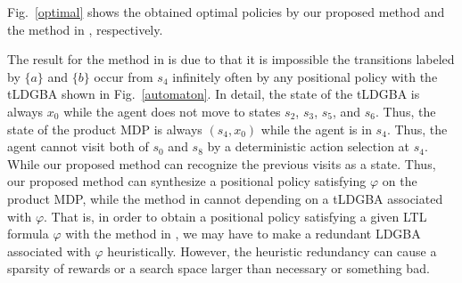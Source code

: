 \documentclass[letterpaper, 10 pt, conference]{ieeeconf}  %
\begin{document}
Fig.\ \ref{optimal} shows the obtained optimal policies by our proposed method and the method in \cite{HAK2019,HKAKPL2019}, respectively.

The result for the method in \cite{HAK2019,HKAKPL2019} is due to that it is impossible the transitions labeled by $\{ a \}$ and $\{ b \}$ occur from $s_4$ infinitely often by any positional policy with the tLDGBA shown in Fig.\ \ref{automaton}. In detail, the state of the tLDGBA is always $x_0$ while the agent does not move to states $s_2$, $s_3$, $s_5$, and $s_6$. Thus, the state of the product MDP is always $(s_4, x_0)$ while the agent is in $s_4$. Thus, the agent cannot visit both of $s_0$ and $s_8$ by a deterministic action selection at $s_4$. While our proposed method can recognize the previous visits as a state. Thus, our proposed method can synthesize a positional policy satisfying $\varphi$ on the product MDP, while the method in \cite{HAK2019, HKAKPL2019} cannot depending on a tLDGBA associated with $\varphi$. That is, in order to obtain a positional policy satisfying a given LTL formula $\varphi$ with the method in \cite{HAK2019,HKAKPL2019}, we may have to make a redundant LDGBA associated with $\varphi$ heuristically. However, the heuristic redundancy can cause a sparsity of rewards or a search space larger than necessary or something bad.
\end{document}
